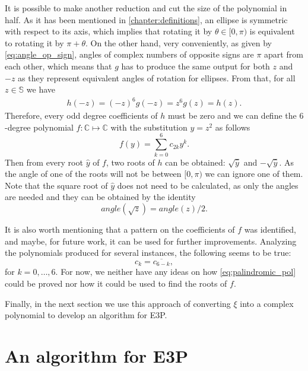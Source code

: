 It is possible to make another reduction and cut the size of the polynomial in half.
As it has been mentioned in \autoref{chapter:definitions}, an ellipse is symmetric with respect to its axis, which implies that rotating it by $\theta \in [0, \pi)$ is equivalent to rotating it by $\pi + \theta$.
On the other hand, very conveniently, as given by \autoref{eq:angle_op_sign}, angles of complex numbers of opposite signs are $\pi$ apart from each other, which means that $g$ has to produce the same output for both $z$ and $-z$ as they represent equivalent angles of rotation for ellipses.
From that, for all $z\in \mathbb{S}$ we have
\begin{align*}
h(-z) = (-z)^6g(-z) = z^6g(z) = h(z).
\end{align*}
Therefore, every odd degree coefficients of $h$ must be zero and we can define the $6$-degree polynomial $f : \mathbb{C} \mapsto \mathbb{C}$ with the substitution $y=z^2$ as follows
\begin{equation}\label{eq:poly_f}
f(y) = \sum_{k=0}^{6} c_{2k} y^k.
\end{equation}
Then from every root $\hat{y}$ of $f$, two roots of $h$ can be obtained: $\sqrt{\hat{y}}$ and $-\sqrt{\hat{y}}$. As the angle of one of the roots will not be between $[0, \pi)$ we can ignore one of them. 
Note that the square root of $\hat{y}$ does not need to be calculated, as only the angles are needed and they can be obtained by the identity
\begin{equation*}
angle(\sqrt{z}) = angle(z)/2.
\end{equation*}

It is also worth mentioning that a pattern on the coefficients of $f$ was identified, and maybe, for future work, it can be used for further improvements. Analyzing the polynomials produced for several instances, the following seems to be true:
\begin{equation}\label{eq:palindromic_pol}
c_k = \overline{c_{6-k}},
\end{equation}
for $k=0, \dots, 6$. For now, we neither have any ideas on how \autoref{eq:palindromic_pol} could be proved nor how it could be used to find the roots of $f$.

Finally, in the next section we use this approach of converting $\xi$ into a complex polynomial to develop an algorithm for E3P.

\section{An algorithm for E3P}

